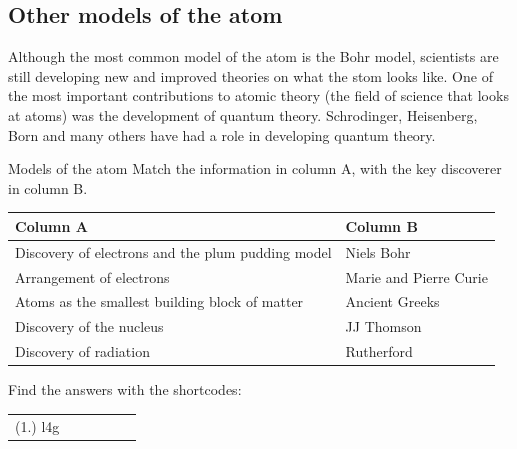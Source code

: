             \subsection*{Other models of the atom}
            \nopagebreak
            \label{m38756*eip-993}
Although the most common model of the atom is the Bohr model, scientists are still developing new and improved theories on what the stom looks like. One of the most important contributions to atomic theory (the field of science that looks at atoms) was the development of quantum theory. Schrodinger, Heisenberg, Born and many others have had a role in developing quantum theory.  
\par \label{m38756*eip-179}
            \begin{exercises}{Models of the atom}
            \nopagebreak
            \label{m38756*eip-786}Match the information in column A, with the key discoverer in column B.
          \begin{table}[H]
        \begin{center}
      \label{m38756*eip-551}
      \begin{tabular}{|l|l|}\hline
        Column A &
        Column B \\ \hline
        Discovery of electrons and the plum pudding model &
        Niels Bohr \\ \hline
        Arrangement of electrons &
        Marie and Pierre Curie  \\ \hline
        Atoms as the smallest building block of matter &
        Ancient Greeks \\ \hline
        Discovery of the nucleus &
        JJ Thomson \\ \hline
        Discovery of radiation &
        Rutherford \\ \hline
    \end{tabular}
      \end{center}
\end{table}
    \par
        \par 
    \label{m38756*cid3}
\par {} Find the answers with the shortcodes:
 \par \begin{tabular}[h]{cccccc}
 (1.) l4g  & \end{tabular}
\end{exercises}
